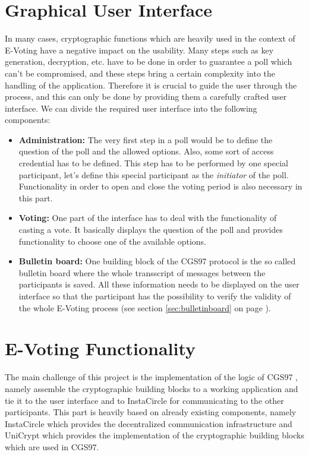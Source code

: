\documentclass[numbers=noenddot, abstract=on]{scrreprt}
\newcommand{\myref}[1]{(see section \ref{#1} on page \pageref{#1})}
\begin{document}
\section{Graphical User Interface}
\label{sec:gui}
In many cases, cryptographic functions which are heavily used in the context of
E-Voting have a negative impact on the usability. Many steps such as key
generation, decryption, etc. have to be done in order to guarantee a poll which
can't be compromised, and these steps bring a certain complexity into the
handling of the application. Therefore it is crucial to guide the user
through the process, and this can only be done by providing them a carefully
crafted user interface. We can divide the required user interface into the
following components:
\begin{itemize}
  \item \textbf{Administration:} The very first step in a poll would be to
  define the question of the poll and the allowed options. Also, some sort of
  access credential has to be defined. This step has to be performed by one
  special participant, let's define this special participant as the
  \textit{initiator} of the poll. Functionality in order to open and close the
  voting period is also necessary in this part.
  \item \textbf{Voting:} One part of the interface has to deal with the
  functionality of casting a vote. It basically displays the question of the
  poll and provides functionality to choose one of the available options.
  \item \textbf{Bulletin board:} One building block of the CGS97 protocol
  \cite{CGS97} is the so called bulletin board where the whole transscript of
  messages between the participants is saved. All these information needs to be displayed on the
  user interface so that the participant has the possibility to verify the
  validity of the whole E-Voting process \myref{sec:bulletinboard}.
\end{itemize}

\section{E-Voting Functionality}
\label{sec:evotingfunctionality}
The main challenge of this project is the implementation of the logic of CGS97 
\cite{CGS97}, namely assemble the cryptographic building blocks to a working
application and tie it to the user interface and to InstaCircle for communicating to the other
participants. This part is heavily based on already existing components, namely
InstaCircle which provides the decentralized communication infrastructure and
UniCrypt which provides the implementation of the cryptographic building blocks
which are used in CGS97.
\end{document}
